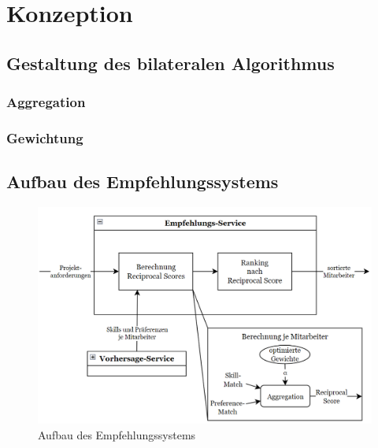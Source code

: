 
\chapter{Konzeption}
\label{ch:algorithmus}

\section{Gestaltung des bilateralen Algorithmus}

\subsection{Aggregation}

\subsection{Gewichtung}

\section{Aufbau des Empfehlungssystems}

\begin{figure}[H]
    \centering
	\includegraphics[width=1.0\textwidth]{gfx/empfehlungsservice.png}
	\caption[Aufbau des Empfehlungssystems]{Aufbau des Empfehlungssystems}
	\label{fig:algorithmus:abb1}
\end{figure}


